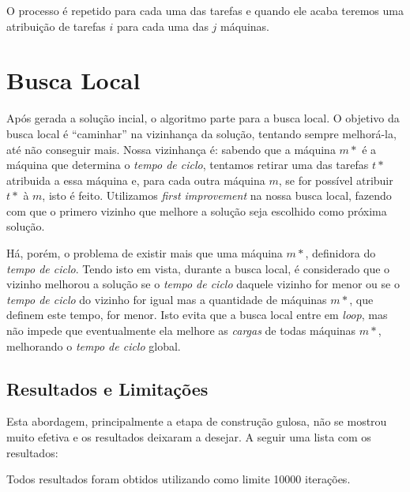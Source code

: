\documentclass{report}
\begin{document}
O processo é repetido para cada uma das tarefas e quando ele acaba teremos
uma atribuição de tarefas $i$ para cada uma das $j$ máquinas.

\section{Busca Local}

Após gerada a solução incial, o algoritmo parte para a busca local.
O objetivo da busca local é ``caminhar'' na
vizinhança da solução, tentando sempre melhorá-la, até não conseguir mais.
Nossa vizinhança é: sabendo que a máquina $m*$
é a máquina que determina o \emph{tempo de ciclo},
tentamos retirar uma das tarefas $t*$ atribuida a essa máquina e, para cada
outra máquina $m$, se for possível atribuir $t*$ à $m$, isto é feito.
Utilizamos \textit{first improvement} na nossa busca
local, fazendo com que o primero vizinho que melhore a solução seja
escolhido como próxima solução.

Há, porém, o problema de existir mais que uma máquina $m*$,
definidora do \emph{tempo de ciclo}. Tendo isto em vista,
durante a busca local, é considerado que o vizinho melhorou a
solução se o \emph{tempo de ciclo} daquele vizinho for
menor ou se o \emph{tempo de ciclo} do vizinho for igual mas a
quantidade de máquinas $m*$, que definem este tempo, for
menor. Isto evita que a busca local entre em \emph{loop}, mas não impede que
eventualmente ela melhore as \emph{cargas} de
todas máquinas $m*$, melhorando o \emph{tempo de ciclo} global.

\subsection{Resultados e Limitações}

Esta abordagem, principalmente a etapa de construção gulosa, não se mostrou muito
efetiva e os resultados deixaram a desejar. A seguir uma lista com os resultados:

Todos resultados foram obtidos utilizando como limite 10000 iterações.
\end{document}
